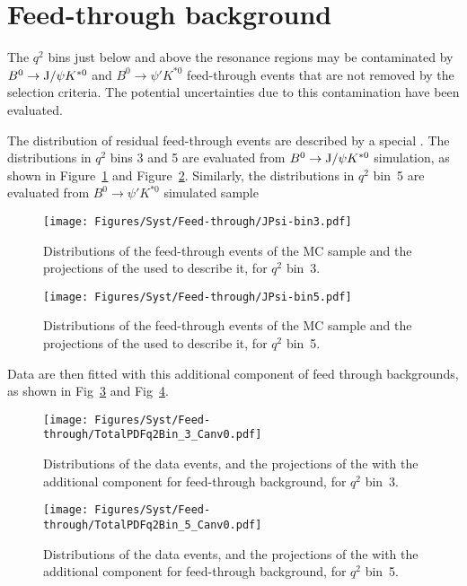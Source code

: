 \clearpage

\section{Feed-through background}
\label{sec:feedthr}

The $q^2$ bins just below and above the resonance regions may be contaminated by $B^0 \to {\rm J/}\psi K^{*0}$ and $B^0 \to \psi' K^{*0}$ feed-through events that are not removed by the selection criteria.
The potential uncertainties due to this contamination have been evaluated.

The distribution of residual feed-through events are described by a special \pdf.
The distributions in $q^2$ bins 3 and 5 are evaluated from $B^0 \to {\rm J/}\psi K^{*0}$ simulation, as shown in Figure~\ref{fig:feed-J-bin3} and Figure~\ref{fig:feed-J-bin5}.
Similarly, the distributions in $q^2$ bin~5 are evaluated from $B^0 \to \psi' K^{*0}$ simulated sample


\begin{figure}[!hbt]
  \centering
  \texttt{[image: Figures/Syst/Feed-through/JPsi-bin3.pdf]}
  \caption{Distributions of the feed-through events of the \BtoKstJpsi MC sample and the projections of the \pdf used to describe it, for $q^2$ bin~3.
  }
  \label{fig:feed-J-bin3}
\end{figure}

\begin{figure}[!hbt]
  \centering
  \texttt{[image: Figures/Syst/Feed-through/JPsi-bin5.pdf]}
  \caption{Distributions of the feed-through events of the \BtoKstJpsi MC sample and the projections of the \pdf used to describe it, for $q^2$ bin~5.
  }
  \label{fig:feed-J-bin5}
\end{figure} 

Data are then fitted with this additional component of feed through backgrounds, as shown in Fig~\ref{fig:feed-t-bin3} and Fig~\ref{fig:feed-t-bin5}.

\begin{figure}[!hbt]
  \centering
  \texttt{[image: Figures/Syst/Feed-through/TotalPDFq2Bin\_3\_Canv0.pdf]}
  \caption{Distributions of the data events, and the projections of the \pdf with the additional component for feed-through background, for $q^2$ bin~3.}
  \label{fig:feed-t-bin3}
\end{figure}

\begin{figure}[!hbt]
  \centering
  \texttt{[image: Figures/Syst/Feed-through/TotalPDFq2Bin\_5\_Canv0.pdf]}
  \caption{Distributions of the data events, and the projections of the \pdf with the additional component for feed-through background, for $q^2$ bin~5.}
  \label{fig:feed-t-bin5}
\end{figure} 

